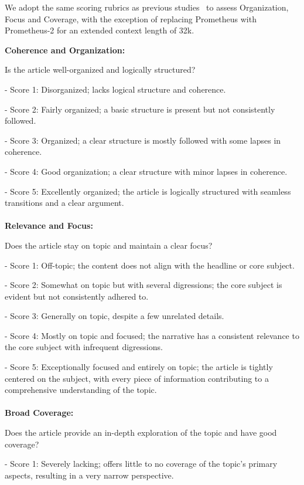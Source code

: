 We adopt the same scoring rubrics as previous studies~\citep{shao2024assisting} to assess Organization, Focus and Coverage, with the exception of replacing Prometheus with Prometheus-2 for an extended context length of 32k.
\begin{tcolorbox}[title = {Criteria Description for Organization Score, Focus Score and Coverage Score}]


\textbf{ Coherence and Organization:} 

Is the article well-organized and logically structured? 

- Score 1: Disorganized; lacks logical structure and coherence. 

- Score 2: Fairly organized; a basic structure is present but not consistently followed. 

- Score 3: Organized; a clear structure is mostly followed with some lapses in coherence. 

- Score 4: Good organization; a clear structure with minor lapses in coherence. 

- Score 5: Excellently organized; the article is logically structured with seamless transitions and a clear argument. \\\\

\textbf{Relevance and Focus:} 

Does the article stay on topic and maintain a clear focus? 

- Score 1: Off-topic; the content does not align with the headline or core subject. 

- Score 2: Somewhat on topic but with several digressions; the core subject is evident but not consistently adhered to. 

- Score 3: Generally on topic, despite a few unrelated details. 

- Score 4: Mostly on topic and focused; the narrative has a consistent relevance to the core subject with infrequent digressions. 

- Score 5: Exceptionally focused and entirely on topic; the article is tightly centered on the subject, with every piece of information contributing to a comprehensive understanding of the topic.\\\\ 

\textbf{Broad Coverage:} 

Does the article provide an in-depth exploration of the topic and have good coverage? 

- Score 1: Severely lacking; offers little to no coverage of the topic’s primary aspects, resulting in a very narrow perspective. 


\end{tcolorbox}
